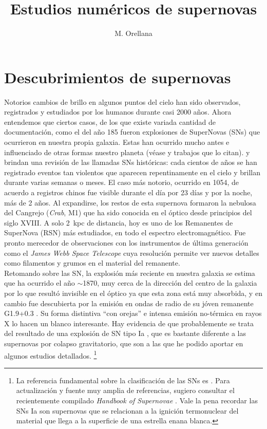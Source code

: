 \documentclass[baaa]{baaa}
\title{Estudios numéricos de supernovas}
\author{
M. Orellana\inst{1,2}
}
\institute{Laboratorio de Investigación Científica en Astronomía, UNRN, Argentina\and
Consejo Nacional de Investigaciones Cient\'ificas y T\'ecnicas, Argentina
}
\begin{document}
\maketitle
\section{Descubrimientos de supernovas}\label{S_intro}

Notorios cambios de brillo en algunos puntos del cielo han sido observados, registrados y estudiados por los humanos durante casi 2000 años. Ahora entendemos que ciertos casos, de los que existe variada cantidad de documentación, como el del año 185 fueron explosiones de SuperNovas (SNs) que ocurrieron en nuestra propia galaxia. Estas han ocurrido mucho antes e influenciado de otras formas nuestro planeta (véase \citealt{2002Benitez} y trabajos que lo citan).
\cite{2003Green} y \cite{2021Al}
brindan una revisión de las llamadas SNs históricas: cada cientos de años se han registrado eventos tan violentos que aparecen repentinamente en el cielo y brillan durante varias semanas o meses.
El caso más notorio, ocurrido en 1054, de acuerdo a registros chinos fue visible durante el día por 23 días y por la noche, más de 2 años. 
Al expandirse, los restos de esta supernova formaron la nebulosa del Cangrejo ({\em Crab}, M1) que ha sido conocida en el óptico desde principios del siglo {\sc XVIII}.
A solo 2~kpc de distancia, hoy es uno de los Remanentes de SuperNova (RSN) más estudiados, en todo el espectro electromagnético. Fue pronto merecedor de observaciones con los instrumentos de última generación como el {\sl James Webb Space Telescope} cuya resolución permite ver nuevos detalles como filamentos y grumos en el material del remanente.\\

Retomando sobre las SN, la explosión más reciente en nuestra galaxia se estima que ha ocurrido el año $\sim$1870, muy cerca de la dirección del centro de la galaxia por lo que resultó invisible en el óptico ya que esta zona está muy absorbida, y en cambio fue descubierta por la emisión en ondas de radio de su jóven remanente G1.9+0.3 \citep{1984Green}.
Su forma distintiva ``con orejas'' e intensa emisión no-térmica en rayos X \citep{2008Reynolds} lo hacen un blanco interesante.
Hay evidencia de que probablemente se trata del resultado de una explosión de SN tipo Ia \citep{2013Borkowski}, que es bastante diferente a las supernovas por colapso gravitatorio, que son a las que he podido aportar en algunos estudios detallados. \footnote{
La referencia fundamental sobre la clasificación de las SNs es \cite{1997Filipenko}. Para actualización
y fuente muy amplia de referencias, sugiero consultar el recientemente compilado {\em Handbook of Supernovae} \citep{handbook}. Vale la pena recordar las SNs Ia son supernovas que se relacionan a la ignición termonuclear del material que llega a la superficie de una estrella enana blanca.}\\
\end{document}
